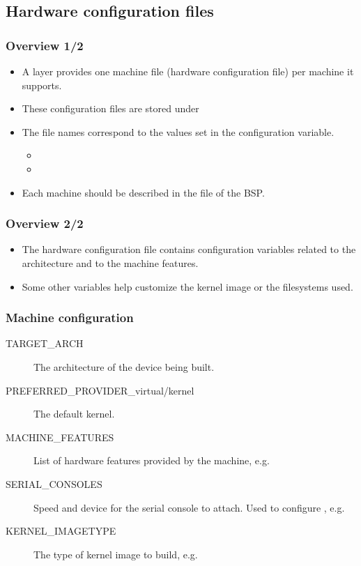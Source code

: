 \subsection{Hardware configuration files}

\begin{frame}
  \frametitle{Overview 1/2}
  \begin{itemize}
    \item A layer provides one machine file (hardware configuration
      file) per machine it supports.
    \item These configuration files are stored under
    \item The file names correspond to the values set in the
       configuration variable.
      \begin{itemize}
        \item {}
        \item {}
      \end{itemize}
    \item Each machine should be described in the  file
      of the BSP.
  \end{itemize}
\end{frame}

\begin{frame}
  \frametitle{Overview 2/2}
  \begin{itemize}
    \item The hardware configuration file contains configuration
      variables related to the architecture and to the machine
      features.
    \item Some other variables help customize the kernel image or the
      filesystems used.
  \end{itemize}
\end{frame}

\begin{frame}
  \frametitle{Machine configuration}
  \begin{description}
    \item[TARGET\_ARCH] The architecture of the device being built.
    \item[PREFERRED\_PROVIDER\_virtual/kernel] The default kernel.
    \item[MACHINE\_FEATURES] List of hardware features provided by the
      machine, e.g. 
    \item[SERIAL\_CONSOLES] Speed and device for the serial console to
	    attach. Used to configure ,
      e.g. 
    \item[KERNEL\_IMAGETYPE] The type of kernel image to build, e.g.
  \end{description}
\end{frame}

